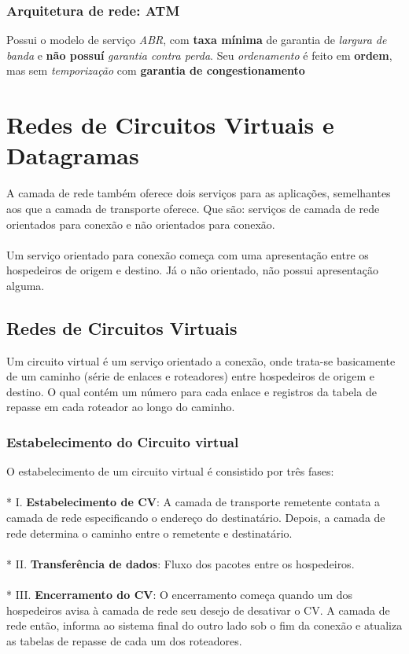 \documentclass[a4paper, 12pt]{article}
\begin{document}
    \subsubsection{Arquitetura de rede: ATM}
    Possui o modelo de serviço \textit{ABR}, com \textbf{taxa mínima} de garantia de \textit{largura de banda} e \textbf{não possuí} 
    \textit{garantia contra perda}.
    Seu \textit{ordenamento} é feito em \textbf{ordem}, mas sem \textit{temporização} com \textbf{garantia de congestionamento} 

\newpage

\section{Redes de Circuitos Virtuais e Datagramas}
A camada de rede também oferece dois serviços para as aplicações, semelhantes aos que a camada de transporte oferece. Que são: serviços 
de camada de rede orientados para conexão e não orientados para conexão.
\\
\\
Um serviço orientado para conexão começa com uma apresentação entre os hospedeiros de origem e destino. Já o não orientado, não possui 
apresentação alguma.
\subsection{Redes de Circuitos Virtuais}
Um circuito virtual é um serviço orientado a conexão, onde trata-se basicamente de um caminho (série de enlaces e roteadores) entre 
hospedeiros de origem e destino. O qual contém um número para cada enlace e registros da tabela de repasse em cada roteador ao longo do caminho.

    \subsubsection{Estabelecimento do Circuito virtual}
    O estabelecimento de um circuito virtual é consistido por três fases:
        \\
        \\*
        I. \textbf{Estabelecimento de CV}: A camada de transporte remetente contata a camada de rede especificando o endereço do destinatário.
        Depois, a camada de rede determina o caminho entre o remetente e destinatário.
        \\
        \\*
        II. \textbf{Transferência de dados}: Fluxo dos pacotes entre os hospedeiros.
        \\
        \\*
        III. \textbf{Encerramento do CV}: O encerramento começa quando um dos hospedeiros avisa à camada de rede seu desejo de desativar o CV.
        A camada de rede então, informa ao sistema final do outro lado sob o fim da conexão e atualiza as tabelas de repasse de cada um dos
        roteadores.
\end{document}
